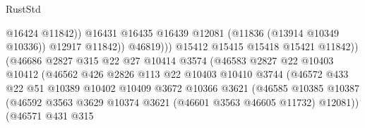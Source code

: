 \begin{lexlean}{RustStd}
\begin{coremodule}
                                                @16424
                                                @11842))
                                            @16431
                                            @16435
                                            @16439
                                            @12081
                                            (@11836 (@13914 @10349 @10336))
                                            @12917
                                            @11842))
                                        @46819)))
                                  @15412
                                  @15415
                                  @15418
                                  @15421
                                  @11842))
                              (@46686
                                @2827
                                @315
                                @22
                                @27
                                @10414
                                @3574
                                (@46583
                                  @2827
                                  @22
                                  @10403
                                  @10412
                                  (@46562
                                    @426
                                    @2826
                                    @113
                                    @22
                                    @10403
                                    @10410
                                    @3744
                                    (@46572
                                      @433
                                      @22
                                      @51
                                      @10389
                                      @10402
                                      @10409
                                      @3672
                                      @10366
                                      @3621
                                      (@46585
                                        @10385
                                        @10387
                                        (@46592
                                          @3563
                                          @3629
                                          @10374
                                          @3621
                                          (@46601 @3563 @46605 @11732)
                                          @12081))
                                      (@46571
                                        @431
                                        @315

\end{coremodule}
\end{lexlean}
